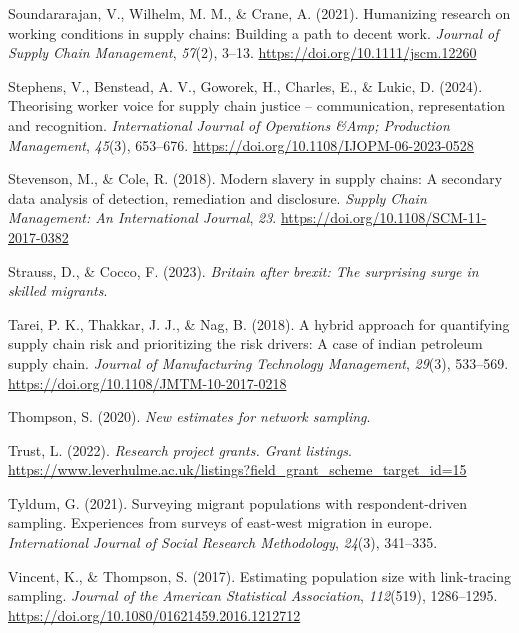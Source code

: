 \documentclass[
  12pt,
]{article}
\newlength{\cslhangindent}
\newenvironment{CSLReferences}[2] %
 {\begin{list}{}{%
  \setlength{\itemindent}{0pt}
  \setlength{\leftmargin}{0pt}
  \setlength{\parsep}{0pt}
  \ifodd #1
   \setlength{\leftmargin}{\cslhangindent}
   \setlength{\itemindent}{-1\cslhangindent}
  \fi
  \setlength{\itemsep}{#2\baselineskip}}}
 {\end{list}}
\theoremstyle{plain}
\theoremstyle{definition}
\begin{document}
\begin{CSLReferences}{1}{0}
Soundararajan, V., Wilhelm, M. M., \& Crane, A. (2021). Humanizing
research on working conditions in supply chains: Building a path to
decent work. \emph{Journal of Supply Chain Management}, \emph{57}(2),
3--13. \url{https://doi.org/10.1111/jscm.12260}

Stephens, V., Benstead, A. V., Goworek, H., Charles, E., \& Lukic, D.
(2024). Theorising worker voice for supply chain justice --
communication, representation and recognition. \emph{International
Journal of Operations \&Amp; Production Management}, \emph{45}(3),
653--676. \url{https://doi.org/10.1108/IJOPM-06-2023-0528}

Stevenson, M., \& Cole, R. (2018). Modern slavery in supply chains: A
secondary data analysis of detection, remediation and disclosure.
\emph{Supply Chain Management: An International Journal}, \emph{23}.
\url{https://doi.org/10.1108/SCM-11-2017-0382}

Strauss, D., \& Cocco, F. (2023). \emph{Britain after brexit: The
surprising surge in skilled migrants}.

Tarei, P. K., Thakkar, J. J., \& Nag, B. (2018). A hybrid approach for
quantifying supply chain risk and prioritizing the risk drivers: A case
of indian petroleum supply chain. \emph{Journal of Manufacturing
Technology Management}, \emph{29}(3), 533--569.
\url{https://doi.org/10.1108/JMTM-10-2017-0218}

Thompson, S. (2020). \emph{New estimates for network sampling}.

Trust, L. (2022). \emph{Research project grants. Grant listings}.
\url{https://www.leverhulme.ac.uk/listings?field_grant_scheme_target_id=15}

Tyldum, G. (2021). Surveying migrant populations with respondent-driven
sampling. Experiences from surveys of east-west migration in europe.
\emph{International Journal of Social Research Methodology},
\emph{24}(3), 341--335.

Vincent, K., \& Thompson, S. (2017). Estimating population size with
link-tracing sampling. \emph{Journal of the American Statistical
Association}, \emph{112}(519), 1286--1295.
\url{https://doi.org/10.1080/01621459.2016.1212712}


\end{CSLReferences}
\end{document}
